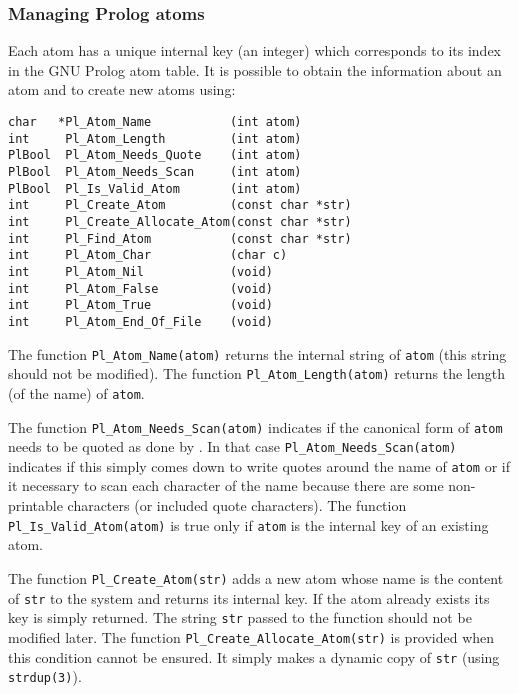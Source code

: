\subsubsection{Managing Prolog atoms}

Each atom has a unique internal key (an integer) which corresponds to its index in the
GNU Prolog atom table. It is possible to obtain the information about an atom
and to create new atoms using:

\begin{Indentation}
\begin{verbatim}
char   *Pl_Atom_Name           (int atom)
int     Pl_Atom_Length         (int atom)
PlBool  Pl_Atom_Needs_Quote    (int atom)
PlBool  Pl_Atom_Needs_Scan     (int atom)
PlBool  Pl_Is_Valid_Atom       (int atom)
int     Pl_Create_Atom         (const char *str)
int     Pl_Create_Allocate_Atom(const char *str)
int     Pl_Find_Atom           (const char *str)
int     Pl_Atom_Char           (char c)
int     Pl_Atom_Nil            (void)
int     Pl_Atom_False          (void)
int     Pl_Atom_True           (void)
int     Pl_Atom_End_Of_File    (void)
\end{verbatim}
\end{Indentation}

The function \texttt{Pl\_Atom\_Name(atom)} returns the internal string of
\texttt{atom} (this string should not be modified). The function
\texttt{Pl\_Atom\_Length(atom)} returns the length (of the name) of
\texttt{atom}.

The function \texttt{Pl\_Atom\_Needs\_Scan(atom)} indicates if the canonical
form of \texttt{atom} needs to be quoted as done by 
. In that case \texttt{Pl\_Atom\_Needs\_Scan(atom)}
indicates if this simply comes down to write quotes around the name of
\texttt{atom} or if it necessary to scan each character of the name because
there are some non-printable characters (or included quote characters). The
function \texttt{Pl\_Is\_Valid\_Atom(atom)} is true only if \texttt{atom} is the
internal key of an existing atom.

The function \texttt{Pl\_Create\_Atom(str)} adds a new atom whose name is the
content of \texttt{str} to the system and returns its internal key. If the
atom already exists its key is simply returned. The string \texttt{str}
passed to the function should not be modified later. The function
\texttt{Pl\_Create\_Allocate\_Atom(str)} is provided when this condition cannot
be ensured. It simply makes a dynamic copy of \texttt{str}
(using \texttt{strdup(3)}).

